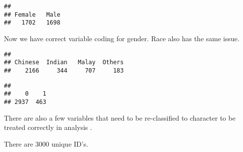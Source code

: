 \documentclass[
]{article}
\newenvironment{Shaded}{\begin{snugshade}}{\end{snugshade}}
\newcommand{\FunctionTok}[1]{\textcolor[rgb]{0.13,0.29,0.53}{\textbf{#1}}}
\newcommand{\NormalTok}[1]{#1}
\newcommand{\OtherTok}[1]{\textcolor[rgb]{0.56,0.35,0.01}{#1}}
\newcommand{\SpecialCharTok}[1]{\textcolor[rgb]{0.81,0.36,0.00}{\textbf{#1}}}
\newcommand{\StringTok}[1]{\textcolor[rgb]{0.31,0.60,0.02}{#1}}
\begin{document}
\begin{verbatim}
## 
## Female   Male 
##   1702   1698
\end{verbatim}

Now we have correct variable coding for gender. Race also has the same
issue.

\begin{Shaded}
\end{Shaded}

\begin{verbatim}
## 
## Chinese  Indian   Malay  Others 
##    2166     344     707     183
\end{verbatim}

\begin{Shaded}
\end{Shaded}

\begin{verbatim}
## 
##    0    1 
## 2937  463
\end{verbatim}

There are also a few variables that need to be re-classified to
character to be treated correctly in analysis .

There are 3000 unique ID's.
\end{document}
